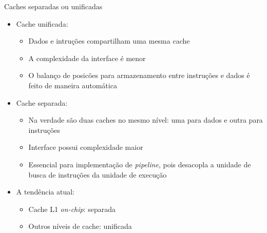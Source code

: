 \begin{slide}{Caches separadas ou unificadas}
	\begin{itemize}
		\item Cache unificada:
			\begin{itemize}
				\item Dados e intruções compartilham uma mesma cache
				\item A complexidade da interface é menor
				\item O balanço de posicões para armazenamento entre instruções e dados é feito de maneira automática
			\end{itemize}
		\item Cache separada:
			\begin{itemize}
				\item Na verdade são duas caches no mesmo nível: uma para dados e outra para instruções
				\item Interface possui complexidade maior
				\item Essencial para implementação de \emph{pipeline}, pois desacopla a unidade de busca de instruções da unidade de execução
			\end{itemize}
		\item A tendência atual:
			\begin{itemize}
				\item Cache L1 \emph{on-chip}: separada
				\item Outros níveis de cache: unificada
			\end{itemize}
	\end{itemize}
\end{slide}


